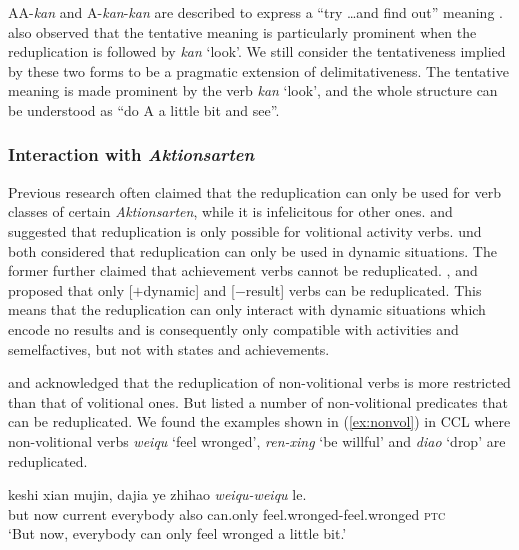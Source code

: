 AA-\textit{kan} and A-\textit{kan}-\textit{kan} are described to express a ``try \ldots and find out'' meaning \citep[63]{Cheng2012}.
\citet[290]{Tsao2001} also observed that the tentative meaning is particularly prominent when the reduplication is followed by \textit{kan} `look'.
We still consider the tentativeness implied by these two forms to be a pragmatic extension of delimitativeness.
The tentative meaning is made prominent by the verb \textit{kan} `look',
and the whole structure can be understood as ``do A a little bit and see''.




\subsubsection{Interaction with \textit{Aktionsarten}}\label{sec:Aktionsarten}

Previous research often claimed that the reduplication can only be used for verb classes of certain \textit{Aktionsarten}, while it is infelicitous for other ones.
\citet[277--278]{Hong1999} and \citet[234--235]{LiThompson1981} suggested that reduplication is only possible for volitional activity verbs.
\citet[70--71]{Dai1997} und \citet[290]{Tsao2001} both considered that reduplication can only be used in dynamic situations.
The former further claimed that achievement verbs cannot be reduplicated.
 \citet[155]{XiaoMcEnery2004}, \citet[20]{Arcodiaetal2014} and \citet{BascianoMelloni2017} proposed that only [$+$dynamic] and [$-$result] verbs can be reduplicated.
This means that the reduplication can only interact with dynamic situations which encode no results and is consequently only compatible with activities and semelfactives, but not with states and achievements.

\citet[53]{Chen2001} and \citet[10--11]{Yang2003} acknowledged that the reduplication of non\hyp{}vo\-li\-tion\-al verbs is more restricted than that of volitional ones.
But \citet[381--382]{Zhu1998} listed a number of non\hyp{}volitional predicates that can be reduplicated.
We found the examples shown in (\ref{ex:nonvol}) in {CCL} where non\nobreakdash-vo\-li\-tion\-al verbs \textit{weiqu} `feel wronged', \textit{ren-xing} `be willful' and \textit{diao} `drop' are reduplicated.

\ea\label{ex:nonvol}
\ea
\gll keshi xian mujin, dajia ye zhihao \textit{weiqu-weiqu} le.\\
but now current everybody also can.only feel.wronged-feel.wronged \textsc{ptc}\\ 
\glt `But now, everybody can only feel wronged a little bit.'

